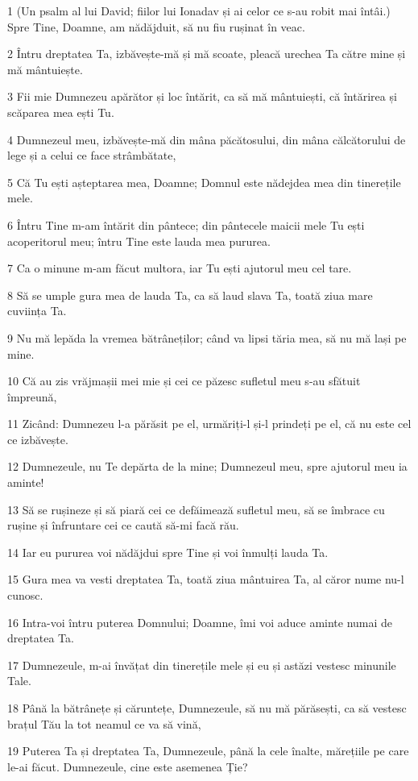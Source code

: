 \par 1 (Un psalm al lui David; fiilor lui Ionadav și ai celor ce s-au robit mai întâi.) Spre Tine, Doamne, am nădăjduit, să nu fiu rușinat în veac.
\par 2 Întru dreptatea Ta, izbăvește-mă și mă scoate, pleacă urechea Ta către mine și mă mântuiește.
\par 3 Fii mie Dumnezeu apărător și loc întărit, ca să mă mântuiești, că întărirea și scăparea mea ești Tu.
\par 4 Dumnezeul meu, izbăvește-mă din mâna păcătosului, din mâna călcătorului de lege și a celui ce face strâmbătate,
\par 5 Că Tu ești așteptarea mea, Doamne; Domnul este nădejdea mea din tinerețile mele.
\par 6 Întru Tine m-am întărit din pântece; din pântecele maicii mele Tu ești acoperitorul meu; întru Tine este lauda mea pururea.
\par 7 Ca o minune m-am făcut multora, iar Tu ești ajutorul meu cel tare.
\par 8 Să se umple gura mea de lauda Ta, ca să laud slava Ta, toată ziua mare cuviința Ta.
\par 9 Nu mă lepăda la vremea bătrâneților; când va lipsi tăria mea, să nu mă lași pe mine.
\par 10 Că au zis vrăjmașii mei mie și cei ce păzesc sufletul meu s-au sfătuit împreună,
\par 11 Zicând: Dumnezeu l-a părăsit pe el, urmăriți-l și-l prindeți pe el, că nu este cel ce izbăvește.
\par 12 Dumnezeule, nu Te depărta de la mine; Dumnezeul meu, spre ajutorul meu ia aminte!
\par 13 Să se rușineze și să piară cei ce defăimează sufletul meu, să se îmbrace cu rușine și înfruntare cei ce caută să-mi facă rău.
\par 14 Iar eu pururea voi nădăjdui spre Tine și voi înmulți lauda Ta.
\par 15 Gura mea va vesti dreptatea Ta, toată ziua mântuirea Ta, al căror nume nu-l cunosc.
\par 16 Intra-voi întru puterea Domnului; Doamne, îmi voi aduce aminte numai de dreptatea Ta.
\par 17 Dumnezeule, m-ai învățat din tinerețile mele și eu și astăzi vestesc minunile Tale.
\par 18 Până la bătrânețe și căruntețe, Dumnezeule, să nu mă părăsești, ca să vestesc brațul Tău la tot neamul ce va să vină,
\par 19 Puterea Ta și dreptatea Ta, Dumnezeule, până la cele înalte, mărețiile pe care le-ai făcut. Dumnezeule, cine este asemenea Ție?
